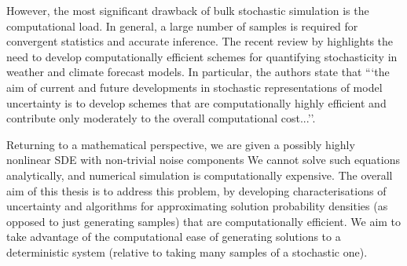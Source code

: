 However, the most significant drawback of bulk stochastic simulation is the computational load.
In general, a large number of samples is required for convergent statistics and accurate inference.
The recent review by \citet{LeutbecherEtAl_2017_StochasticRepresentationsModel} highlights the need to develop computationally efficient schemes for quantifying stochasticity in weather and climate forecast models.
In particular, the authors state that ```the aim of current and future developments in stochastic representations of model uncertainty is to develop schemes that are computationally highly efficient and contribute only moderately to the overall computational cost...''.


Returning to a mathematical perspective, we are given a possibly highly nonlinear SDE with non-trivial noise components
We cannot solve such equations analytically, and numerical simulation is computationally expensive.
The overall aim of this thesis is to address this problem, by developing characterisations of uncertainty and algorithms for approximating solution probability densities (as opposed to just generating samples) that are computationally efficient.
We aim to take advantage of the computational ease of generating solutions to a deterministic system (relative to taking many samples of a stochastic one).



